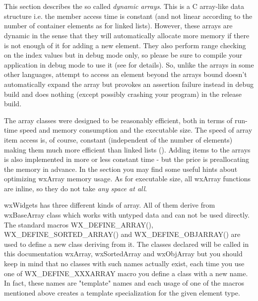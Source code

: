 
\section{}\label{wxarray}

This section describes the so called {\it dynamic arrays}. This is a C
array-like data structure i.e. the member access time is constant (and not
linear according to the number of container elements as for linked lists). However, these
arrays are dynamic in the sense that they will automatically allocate more
memory if there is not enough of it for adding a new element. They also perform
range checking on the index values but in debug mode only, so please be sure to
compile your application in debug mode to use it (see  for
details). So, unlike the arrays in some other
languages, attempt to access an element beyond the arrays bound doesn't
automatically expand the array but provokes an assertion failure instead in
debug build and does nothing (except possibly crashing your program) in the
release build.

The array classes were designed to be reasonably efficient, both in terms of
run-time speed and memory consumption and the executable size. The speed of
array item access is, of course, constant (independent of the number of elements)
making them much more efficient than linked lists ().
Adding items to the arrays is also implemented in more or less constant time -
but the price is preallocating the memory in advance. In the  section
you may find some useful hints about optimizing wxArray memory usage. As for executable size, all
wxArray functions are inline, so they do not take {\it any space at all}.

wxWidgets has three different kinds of array. All of them derive from
wxBaseArray class which works with untyped data and can not be used directly.
The standard macros WX\_DEFINE\_ARRAY(), WX\_DEFINE\_SORTED\_ARRAY() and
WX\_DEFINE\_OBJARRAY() are used to define a new class deriving from it. The
classes declared will be called in this documentation wxArray, wxSortedArray and
wxObjArray but you should keep in mind that no classes with such names actually
exist, each time you use one of WX\_DEFINE\_XXXARRAY macro you define a class
with a new name. In fact, these names are "template" names and each usage of one
of the macros mentioned above creates a template specialization for the given
element type.

